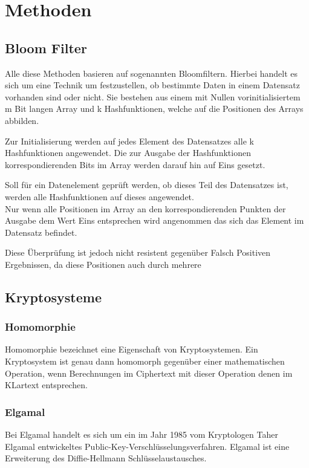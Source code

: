 \chapter{Methoden}
\label{sec:Chapter2}
\section{Bloom Filter}
\label{sec:Sec1.2}

Alle diese Methoden basieren auf sogenannten Bloomfiltern.
Hierbei handelt es sich um eine  Technik um festzustellen, ob bestimmte Daten in einem Datensatz vorhanden sind oder nicht.
Sie bestehen aus einem mit Nullen vorinitialisiertem m Bit langen Array und k Hashfunktionen, welche auf die Positionen des Arrays abbilden.

Zur Initialisierung werden auf jedes Element des Datensatzes alle k Hashfunktionen angewendet.
Die zur Ausgabe der Hashfunktionen korrespondierenden Bits im Array werden darauf hin auf Eins gesetzt.

Soll für ein Datenelement geprüft werden, ob dieses Teil des Datensatzes ist, werden  alle Hashfunktionen auf dieses angewendet.\\
Nur wenn alle Positionen im Array an den korrespondierenden Punkten der Ausgabe dem Wert Eins entsprechen wird angenommen das sich das Element im Datensatz befindet.

Diese Überprüfung ist jedoch nicht resistent gegenüber Falsch Positiven Ergebnissen, da diese Positionen auch durch mehrere 

\section{Kryptosysteme}
\label{sec:Sec1.3}

\subsection{Homomorphie}
Homomorphie bezeichnet eine Eigenschaft von Kryptosystemen. 
Ein Kryptosystem ist genau dann homomorph gegenüber einer mathematischen Operation, wenn Berechnungen im Ciphertext mit dieser Operation denen im KLartext entsprechen.

\subsection{Elgamal}
\label{sec:Sec1.3.1}

Bei Elgamal handelt es sich um ein im Jahr 1985 vom Kryptologen Taher Elgamal entwickeltes Public-Key-Verschlüsselungsverfahren. Elgamal ist eine Erweiterung des Diffie-Hellmann
Schlüsselaustausches.

